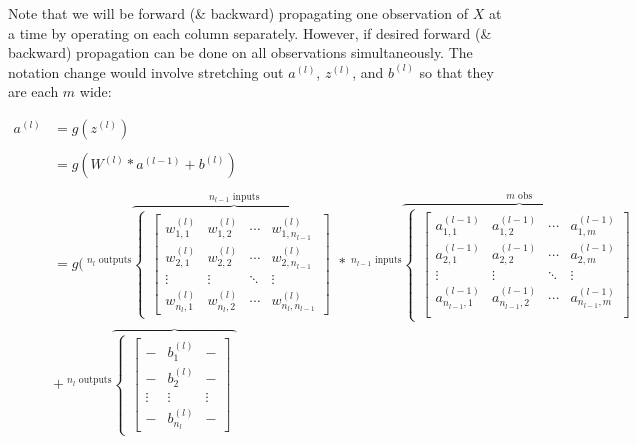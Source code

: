 \documentclass[
]{book}
\begin{document}
Note that we will be forward (\& backward) propagating one observation of \(X\) at a time by operating on each column separately. However, if desired forward (\& backward) propagation can be done on all observations simultaneously. The notation change would involve stretching out \(a^{(l)}\), \(z^{(l)}\), and \(b^{(l)}\) so that they are each \(m\) wide:

\[
\begin{aligned}
a^{(l)} &= g\left(z^{(l)}\right) \\ \\
&= g\left(W^{(l)} * a^{(l - 1)} + b^{(l)}\right) \\ \\
&= g(\ ^{n_l\text{ outputs}}
\overbrace{
  \begin{cases}
    \begin{bmatrix}
    w^{(l)}_{1, 1} & w^{(l)}_{1, 2} & \cdots & w^{(l)}_{1, n_{l-1}} \\
    w^{(l)}_{2, 1} & w^{(l)}_{2, 2} & \cdots & w^{(l)}_{2, n_{l-1}} \\
    \vdots & \vdots & \ddots & \vdots \\
    w^{(l)}_{n_l, 1} & w^{(l)}_{n_l, 2} & \cdots & w^{(l)}_{n_l, n_{l-1}}
    \end{bmatrix}
  \end{cases} 
}^{n_{l - 1} \text{ inputs}} * \ ^{n_{l - 1} \text{ inputs}}
\overbrace{
  \begin{cases}
    \begin{bmatrix}
    a^{(l - 1)}_{1, 1} & a^{(l - 1)}_{1, 2} & \cdots & a^{(l - 1)}_{1, m} \\
    a^{(l - 1)}_{2, 1} & a^{(l - 1)}_{2, 2} & \cdots & a^{(l - 1)}_{2, m} \\
    \vdots & \vdots & \ddots & \vdots \\
    a^{(l - 1)}_{n_{l - 1}, 1} & a^{(l - 1)}_{n_{l - 1}, 2} & \cdots & a^{(l - 1)}_{n_{l - 1}, m} \\
    \end{bmatrix}
  \end{cases} 
}^{m \text{ obs}} \\
&+ \ ^{n_l \text{ outputs}}
\overbrace{
  \begin{cases}
    \begin{bmatrix}
    - & b^{(l)}_{1} & - \\
    - & b^{(l)}_{2} & - \\
    \vdots & \vdots & \vdots \\
    - & b^{(l)}_{n_l} & -
    \end{bmatrix}

\end{cases}}
\end{aligned}\]
\end{document}
